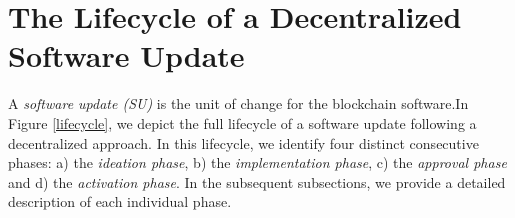 \section{The Lifecycle of a Decentralized Software Update}
A \emph{software update (SU)} is the unit of change for the blockchain software.In Figure \ref{lifecycle}, we depict 
the full lifecycle of a software update following a decentralized approach. In this lifecycle, we identify four distinct consecutive phases: a) the \emph{ideation phase}, b) the \emph{implementation phase}, c) the \emph{approval phase} and d) the \emph{activation phase}.%
  In the subsequent subsections, we provide a detailed description of each individual phase.


